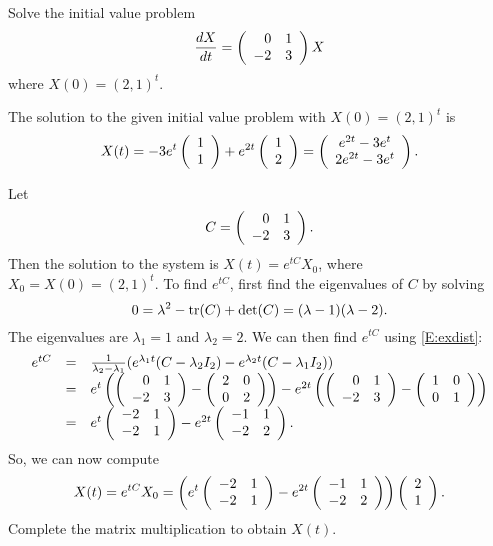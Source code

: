 \documentclass{ximera}
\begin{document}
\EXER

\TEXER

\begin{exercise} \label{c6.6.2}
Solve the initial value problem
\[
\frac{dX}{dt} = \left(\begin{array}{rr} 0 & 1\\ -2 &3\end{array}\right) X
\]
where $X(0)=(2,1)^t$.

\begin{solution}

\ans The solution to the given initial value problem with $X(0) = (2,1)^t$
is
\[
X(t) = -3e^t\left(\begin{array}{r} 1 \\ 1\end{array}\right) + e^{2t}\left(\begin{array}{r} 1 \\ 2\end{array}\right)
= \left(\begin{array}{c} e^{2t} - 3e^t \\ 2e^{2t} - 3e^t\end{array}\right).
\]

\soln Let \[ C = \left(\begin{array}{rr} 0 & 1\\ -2 &3\end{array}\right). \]
Then the solution to the system is $X(t) = e^{tC}X_0$, where
$X_0 = X(0) = (2,1)^t$.
To find $e^{tC}$, first find the eigenvalues of $C$ by solving
\[
0 = \lambda^2 - {\rm tr}(C) + \det(C) = (\lambda - 1)(\lambda - 2).
\]
The eigenvalues are $\lambda_1 = 1$ and $\lambda_2 = 2$.  We can
then find $e^{tC}$ using \eqref{E:exdist}:
\[
\begin{array}{rcl}
e^{tC} & = & \frac{1}{\lambda_2 - \lambda_1}(e^{\lambda_1 t}(C -
\lambda_2 I_2) - e^{\lambda_2 t}(C - \lambda_1 I_2)) \\
& = & e^t\left(\left(\begin{array}{rr} 0 & 1\\ -2 &3\end{array}\right) - \left(\begin{array}{rr} 2 & 0\\ 0 &2\end{array}\right)\right) -
e^{2t}\left(\left(\begin{array}{rr} 0 & 1\\ -2 &3\end{array}\right) - \left(\begin{array}{rr} 1 & 0\\ 0 &1\end{array}\right)\right) \\
& = &
e^t\left(\begin{array}{rr} -2 & 1\\ -2 &1\end{array}\right) - e^{2t}\left(\begin{array}{rr} -1 & 1\\ -2 &2\end{array}\right).
\end{array}
\]
So, we can now compute
\[
X(t) = e^{tC}X_0
= \left(e^t\left(\begin{array}{rr} -2 & 1\\ -2 &1\end{array}\right) -
e^{2t}\left(\begin{array}{rr} -1 & 1\\ -2 &2\end{array}\right)\right)\left(\begin{array}{r} 2 \\ 1\end{array}\right).
\]
Complete the matrix multiplication to obtain $X(t)$.

\end{solution}
\end{exercise}
\end{document}
